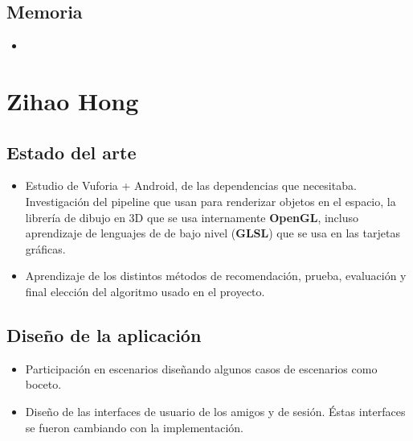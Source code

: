     \subsection{Memoria}
    \label{makereference7.3.3}
        \begin{itemize}
            \item
        \end{itemize}

\section{Zihao Hong}
\label{makereference7.4}
    \subsection{Estado del arte}
    \label{makereference7.4.1}
        \begin{itemize}
            \item Estudio de Vuforia + Android, de las dependencias que necesitaba. Investigación del pipeline 
            que usan para renderizar objetos en el espacio, la librería de dibujo en 3D que se usa internamente \textbf{OpenGL}, 
            incluso aprendizaje de lenguajes de de bajo nivel (\textbf{GLSL}) que se usa en las tarjetas gráficas.
            \item Aprendizaje de los distintos métodos de recomendación, prueba, evaluación y final elección del algoritmo usado en el proyecto.  
        \end{itemize}
    \subsection{Diseño de la aplicación}
    \label{makereference7.4.2}
        \begin{itemize}
            \item Participación en escenarios diseñando algunos casos de escenarios como boceto.
            \item Diseño de las interfaces de usuario de los amigos y de sesión. Éstas interfaces se fueron cambiando con la implementación.
        \end{itemize}
